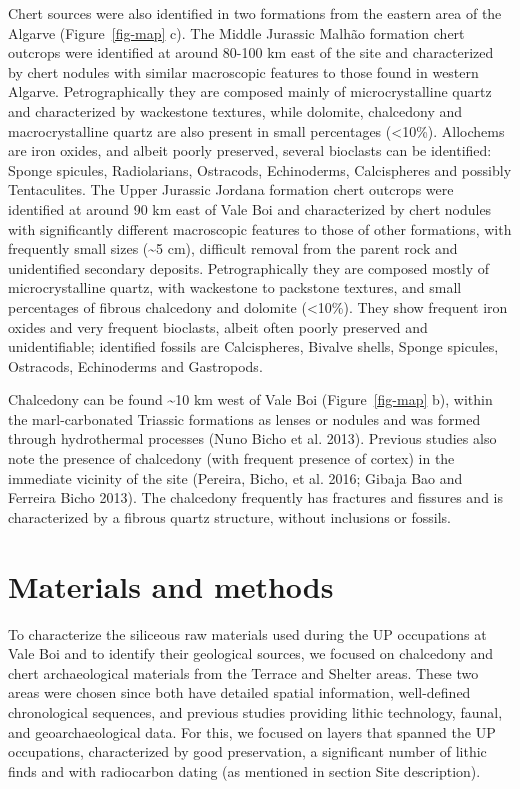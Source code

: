 \documentclass[
  a4paper,
  DIV=11,
  numbers=noendperiod]{scrreprt}
\begin{document}
Chert sources were also identified in two formations from the eastern
area of the Algarve (Figure~\ref{fig-map} c). The Middle Jurassic Malhão
formation chert outcrops were identified at around 80-100 km east of the
site and characterized by chert nodules with similar macroscopic
features to those found in western Algarve. Petrographically they are
composed mainly of microcrystalline quartz and characterized by
wackestone textures, while dolomite, chalcedony and macrocrystalline
quartz are also present in small percentages (\textless10\%). Allochems
are iron oxides, and albeit poorly preserved, several bioclasts can be
identified: Sponge spicules, Radiolarians, Ostracods, Echinoderms,
Calcispheres and possibly Tentaculites. The Upper Jurassic Jordana
formation chert outcrops were identified at around 90 km east of Vale
Boi and characterized by chert nodules with significantly different
macroscopic features to those of other formations, with frequently small
sizes (\textasciitilde5 cm), difficult removal from the parent rock and
unidentified secondary deposits. Petrographically they are composed
mostly of microcrystalline quartz, with wackestone to packstone
textures, and small percentages of fibrous chalcedony and dolomite
(\textless10\%). They show frequent iron oxides and very frequent
bioclasts, albeit often poorly preserved and unidentifiable; identified
fossils are Calcispheres, Bivalve shells, Sponge spicules, Ostracods,
Echinoderms and Gastropods.

Chalcedony can be found \textasciitilde10 km west of Vale Boi
(Figure~\ref{fig-map} b), within the marl-carbonated Triassic formations
as lenses or nodules and was formed through hydrothermal processes (Nuno
Bicho et al. 2013). Previous studies also note the presence of
chalcedony (with frequent presence of cortex) in the immediate vicinity
of the site (Pereira, Bicho, et al. 2016; Gibaja Bao and Ferreira Bicho
2013). The chalcedony frequently has fractures and fissures and is
characterized by a fibrous quartz structure, without inclusions or
fossils.

\section{Materials and methods}\label{materials-and-methods-1}

To characterize the siliceous raw materials used during the UP
occupations at Vale Boi and to identify their geological sources, we
focused on chalcedony and chert archaeological materials from the
Terrace and Shelter areas. These two areas were chosen since both have
detailed spatial information, well-defined chronological sequences, and
previous studies providing lithic technology, faunal, and
geoarchaeological data. For this, we focused on layers that spanned the
UP occupations, characterized by good preservation, a significant number
of lithic finds and with radiocarbon dating (as mentioned in section
Site description).
\end{document}
